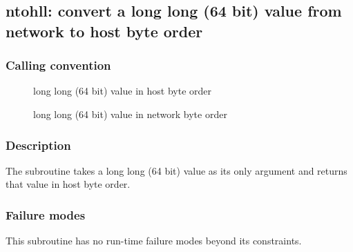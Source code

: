 \clearpage
{}
{}
\label{subr:ntohll}
\subsection*{ntohll: convert a long long (64 bit) value from network
  to host byte order}

\subsubsection*{Calling convention}

\begin{description}
\item[] long long (64 bit) value in host byte order
\item[] long long (64 bit) value in network byte order
\end{description}

\subsubsection*{Description}

The  subroutine takes a long long (64 bit) value as
its only argument and returns that value in host byte order.

\subsubsection*{Failure modes}

This subroutine has no run-time failure modes beyond its constraints.
